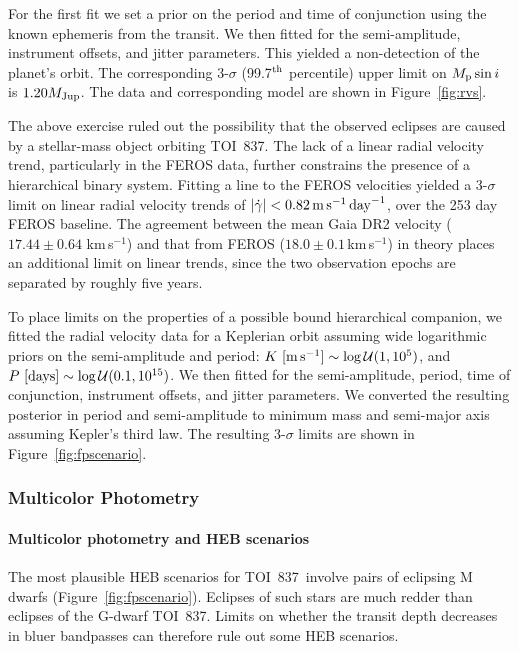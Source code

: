 \documentclass[12pt,twocolumn,tighten]{aastex63}
\newcommand{\tn}{TOI~837} %
\newcommand{\kms}{\,km\,s$^{-1}$}
\begin{document}
For the first fit we set a prior on the period and time of conjunction
using the known ephemeris from the transit.  We then fitted for the
semi-amplitude, instrument offsets, and jitter parameters.  This
yielded a non-detection of the planet's orbit.  The corresponding
3-$\sigma$ (99.7$^{\rm th}$ percentile) upper limit on $M_{\rm p} \sin
i$ is $1.20 M_{\rm Jup}$.  The data and corresponding model are shown
in Figure~\ref{fig:rvs}.

The above exercise ruled out the possibility that the observed
eclipses are caused by a stellar-mass object orbiting \tn.  The lack
of a linear radial velocity trend, particularly in the FEROS data,
further constrains the presence of a hierarchical binary system.
Fitting a line to the FEROS velocities yielded a 3-$\sigma$ limit on
linear radial velocity trends of $|\dot{\gamma}| < 0.82\,{\rm
m\,s}^{-1}\,{\rm day}^{-1}$, over the 253 day FEROS baseline.  The
agreement between the mean Gaia DR2 velocity ($17.44 \pm 0.64\,$\kms)
and that from FEROS ($18.0 \pm 0.1$\kms) in theory places an
additional limit on linear trends, since the two observation epochs
are separated by roughly five years.

To place limits on the properties of a possible bound hierarchical
companion, we fitted the radial velocity data for a Keplerian orbit
assuming wide logarithmic priors on the semi-amplitude and period: $K\
[{\rm m\,s^{-1}}] \sim \log\mathcal{U}(1,10^5)$, and $P\ [{\rm days}]
\sim \log \mathcal{U}(0.1, 10^{15})$.  We then fitted for the
semi-amplitude, period, time of conjunction, instrument offsets, and
jitter parameters.  We converted the resulting posterior in period and
semi-amplitude to minimum mass and semi-major axis assuming Kepler's
third law.  The resulting 3-$\sigma$ limits are shown in
Figure~\ref{fig:fpscenario}.

\subsubsection{Multicolor Photometry}
\label{subsec:colorphot}

\paragraph{Multicolor photometry and HEB scenarios}
The most plausible HEB scenarios for \tn\ involve pairs of eclipsing M
dwarfs (Figure~\ref{fig:fpscenario}).  Eclipses of such stars are much
redder than eclipses of the G-dwarf \tn.  Limits on whether the
transit depth decreases in bluer bandpasses can therefore rule out
some HEB scenarios.
\end{document}
